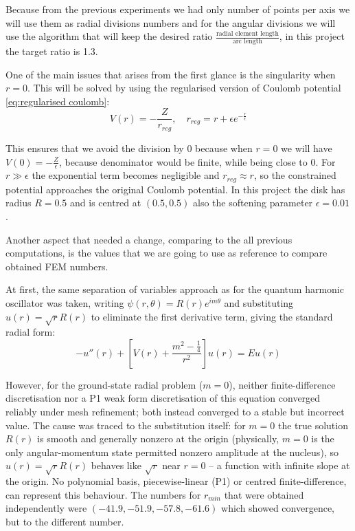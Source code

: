 \documentclass[conference]{IEEEtran}
\begin{document}
Because from the previous experiments we had only number of points per axis we will use them as radial divisions numbers and for the angular divisions we will use the algorithm that will keep the desired ratio $\frac{\text{radial element length}}{\text{arc length}}$, in this project the target ratio is 1.3.

One of the main issues that arises from the first glance is the singularity when $r = 0$. This will be solved by using the regularised version of Coulomb potential \ref{eq:regularised coulomb}:
\begin{equation}
    V(r) = -\frac{Z}{r_{reg}}, \quad r_{reg} = r + \epsilon e^{-\frac{r}{\epsilon}}
    \label{eq:regularised coulomb}
\end{equation}

This ensures that we avoid the division by 0 because when $r = 0$ we will have $V(0) = -\frac{Z}{\epsilon}$, because denominator would be finite, while being close to 0. For $r \gg \epsilon$ the exponential term becomes negligible and $r_{reg} \approx r$, so the constrained potential approaches the original Coulomb potential. In this project the disk has radius $R = 0.5$ and is centred at $(0.5, 0.5)$ also the softening parameter $\epsilon = 0.01$.

Another aspect that needed a change, comparing to the all previous computations, is the values that we are going to use as reference to compare obtained FEM numbers. 

At first, the same separation of variables approach as for the quantum harmonic oscillator was taken, writing $\psi(r, \theta) = R(r)e^{im\theta}$ and substituting $u(r) = \sqrt{r}R(r)$ to eliminate the first derivative term, giving the standard radial form:
\begin{equation}
    -u''(r) + \left[V(r) + \frac{m^2 - \frac{1}{4}}{r^2}\right]u(r) = Eu(r)
\end{equation}

However, for the ground-state radial problem ($m = 0$), neither finite-difference discretisation nor a P1 weak form discretisation of this equation converged reliably under mesh refinement; both instead converged to a stable but incorrect value. The cause was traced to the substitution itself: for $m = 0$ the true solution $R(r)$ is smooth and generally nonzero at the origin (physically, $m = 0$ is the only angular-momentum state permitted nonzero amplitude at the nucleus), so $u(r) = \sqrt{r}R(r)$ behaves like $\sqrt{r}$ near $r = 0$ -- a function with infinite slope at the origin. No polynomial basis, piecewise-linear (P1) or centred finite-difference, can represent this behaviour. The numbers for $r_{min}$ that were obtained independently were $(-41.9, -51.9, -57.8, -61.6)$ which showed convergence, but to the different number.
\end{document}
